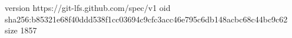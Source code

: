version https://git-lfs.github.com/spec/v1
oid sha256:b85321e68f40ddd538f1cc03694c9cfc3acc46e795c6db148acbc68c44bc9c62
size 1857
